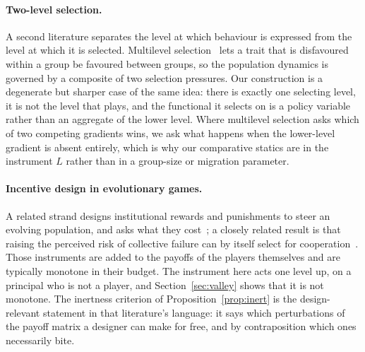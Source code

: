 \documentclass[pdflatex]{sn-jnl}
\theoremstyle{thmstyleone}
\theoremstyle{thmstylethree}
\theoremstyle{thmstyletwo}
\begin{document}
\paragraph{Two-level selection.}
A second literature separates the level at which behaviour is expressed from
the level at which it is selected. Multilevel selection~\citep{wilson1975group,traulsen2006multilevel,okasha2006levels} lets a trait
that is disfavoured within a group be favoured between groups, so the
population dynamics is governed by a composite of two selection pressures.
Our construction is a degenerate but sharper case of the same idea: there is
exactly one selecting level, it is not the level that plays, and the
functional it selects on is a policy variable rather than an aggregate of the
lower level. Where multilevel selection asks which of two competing gradients
wins, we ask what happens when the lower-level gradient is absent entirely,
which is why our comparative statics are in the instrument $L$ rather than in
a group-size or migration parameter.

\paragraph{Incentive design in evolutionary games.}
A related strand designs institutional rewards and punishments to steer an
evolving population, and asks what they cost~\citep{sigmund2010institutions,wang2019optimal}; a closely related
result is that raising the perceived risk of collective failure can by itself
select for cooperation~\citep{santos2011risk}. Those instruments are
added to the payoffs of the players themselves and are typically monotone in
their budget. The instrument here acts one level up, on a principal who is not
a player, and Section~\ref{sec:valley} shows that it is not monotone. The
inertness criterion of Proposition~\ref{prop:inert} is the design-relevant
statement in that literature's language: it says which perturbations of the
payoff matrix a designer can make for free, and by contraposition which ones
necessarily bite.
\end{document}
